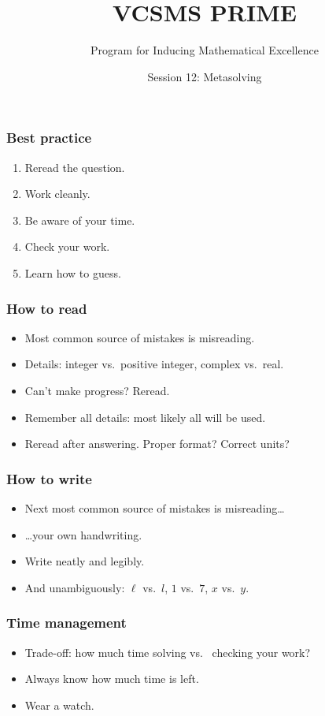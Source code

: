 \documentclass[serif, mathserif, professionalfont]{beamer}
\title{VCSMS PRIME}
\author{Program for Inducing Mathematical Excellence}
\institute{October 27, 2017}
\date{Session 12: Metasolving}
\begin{document}
\begin{frame}
  \titlepage
\end{frame}

\begin{frame}
  \frametitle{Best practice}
  \begin{enumerate}
    \item<2-> Reread the question.
    \item<3-> Work cleanly.
    \item<4-> Be aware of your time.
    \item<5-> Check your work.
    \item<6-> Learn how to guess.
  \end{enumerate}
\end{frame}

\begin{frame}
  \frametitle{How to read}
  \begin{itemize}
    \item<2-> Most common source of mistakes is misreading.
    \item<3-> Details: integer vs.~positive integer, complex vs.~real.
    \item<4-> Can't make progress? Reread.
    \item<5-> Remember all details: most likely all will be used.
    \item<6-> Reread after answering. Proper format? Correct units?
  \end{itemize}
\end{frame}

\begin{frame}
  \frametitle{How to write}
  \begin{itemize}
    \item<2-> Next most common source of mistakes is misreading\dots
    \item<3-> \dots your own handwriting.
    \item<4-> Write neatly and legibly.
    \item<5-> And unambiguously: $\ell$ vs.~$l$, $1$ vs.~$7$, $x$ vs.~$y$.
  \end{itemize}
\end{frame}

\begin{frame}
  \frametitle{Time management}
  \begin{itemize}
    \item<2-> Trade-off: how much time solving vs.~ checking your work?
    \item<3-> Always know how much time is left.
    \item<4-> Wear a watch.
  \end{itemize}
\end{frame}
\end{document}
